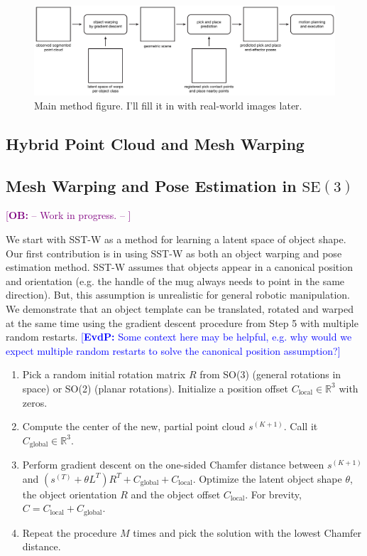 \documentclass{article}
\newcommand{\ob}[1]{\textcolor{purple}{[\textbf{OB:} #1]}}
\newcommand{\evdp}[1]{\textcolor{blue}{[\textbf{EvdP:} #1]}}
\begin{document}
\begin{figure}
    \centering
    \includegraphics[width=\textwidth]{figures/method_figure.pdf}
    \caption{Main method figure. I'll fill it in with real-world images later.}
    \label{fig:latent}
\end{figure}

\subsection{Hybrid Point Cloud and Mesh Warping}
\label{sec:methods:mesh}



\subsection{Mesh Warping and Pose Estimation in $\mathrm{SE}(3)$}
\label{sec:methods:scene}

\ob{-- Work in progress. -- }

We start with SST-W as a method for learning a latent space of object shape. Our first contribution is in using SST-W as both an object warping and pose estimation method. SST-W assumes that objects appear in a canonical position and orientation (e.g. the handle of the mug always needs to point in the same direction). But, this assumption is unrealistic for general robotic manipulation. We demonstrate that an object template can be translated, rotated and warped at the same time using the gradient descent procedure from Step 5 with multiple random restarts. \evdp{Some context here may be helpful, e.g. why would we expect multiple random restarts to solve the canonical position assumption?} 

\begin{enumerate}
    \item Pick a random initial rotation matrix $R$ from SO(3) (general rotations in space) or SO(2) (planar rotations). Initialize a position offset $C_{\text{local}} \in \mathbb{R}^3$ with zeros.
    \item Compute the center of the new, partial point cloud $s^{(K+1)}$. Call it $C_{\text{global}} \in \mathbb{R}^3$.
    \item Perform gradient descent on the one-sided Chamfer distance between $s^{(K+1)}$ and $(s^{(T)} + \theta L^T) R^T + C_{\text{global}} + C_{\text{local}}$. Optimize the latent object shape $\theta$, the object orientation $R$ and the object offset $C_{\text{local}}$. For brevity, $C = C_{\text{local}} + C_{\text{global}}$.
    \item Repeat the procedure $M$ times and pick the solution with the lowest Chamfer distance.
\end{enumerate}
\end{document}
